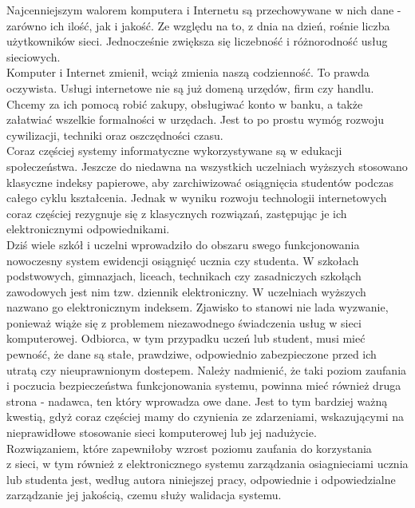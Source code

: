 \documentclass[brudnopis]{xmgr}
\begin{document}
\indent \indent \textcolor{wa}{Najcenniejszym walorem komputera i Internetu są przechowywane w nich dane - zarówno
ich ilość, jak i jakość. Ze względu na to, z dnia na dzień, rośnie liczba
użytkowników sieci. Jednocześnie zwiększa się liczebność i różnorodność usług
sieciowych.}
\\
\indent \textcolor{wa}{Komputer i Internet zmienił, wciąż zmienia naszą codzienność. To prawda oczywista.
Usługi internetowe nie są już domeną urzędów, firm czy handlu. Chcemy za ich pomocą
robić zakupy, obsługiwać konto w banku, a także załatwiać wszelkie formalności w
urzędach. Jest to po prostu wymóg rozwoju cywilizacji, techniki oraz oszczędności
czasu.}
\\
\indent \textcolor{wa}{Coraz częściej systemy informatyczne wykorzystywane są w edukacji społeczeństwa.
Jeszcze do niedawna na wszystkich uczelniach wyższych stosowano klasyczne indeksy
papierowe, aby zarchiwizować osiągnięcia studentów podczas całego cyklu kształcenia.
Jednak w wyniku rozwoju technologii internetowych coraz częściej rezygnuje się
z klasycznych rozwiązań, zastępując je ich elektronicznymi odpowiednikami.}
\\
\indent \textcolor{wb}{Dziś wiele szkół i uczelni wprowadziło do obszaru swego funkcjonowania nowoczesny
system ewidencji osiągnięć ucznia czy studenta. W szkołach podstwowych, gimnazjach,
liceach, technikach czy zasadniczych szkołąch zawodowych jest nim tzw. dziennik
elektroniczny. W uczelniach wyższych  nazwano go elektronicznym indeksem. Zjawisko
to stanowi nie lada wyzwanie, ponieważ wiąże się z problemem niezawodnego świadczenia
usług w sieci komputerowej. Odbiorca, w tym przypadku uczeń lub student, musi mieć
pewność, że dane są stałe, prawdziwe, odpowiednio zabezpieczone przed ich utratą
czy nieuprawnionym dostepem. Należy nadmienić, że taki poziom zaufania i poczucia
bezpieczeństwa funkcjonowania systemu, powinna mieć również druga strona - nadawca,
ten który wprowadza owe dane. Jest to tym bardziej ważną kwestią, gdyż coraz częściej
mamy do czynienia ze zdarzeniami, wskazującymi na nieprawidłowe stosowanie sieci
komputerowej lub jej nadużycie.}
\\
\indent \textcolor{wa}{Rozwiązaniem, które zapewniłoby wzrost poziomu zaufania do korzystania
\\
z sieci,
w tym również z elektronicznego systemu zarządzania osiagnieciami ucznia lub studenta
jest, według autora niniejszej pracy, odpowiednie i odpowiedzialne zarządzanie jej
jakością, czemu służy walidacja systemu.}
\\
\end{document}
